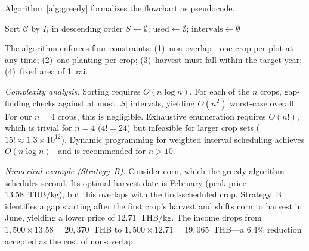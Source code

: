 \documentclass[journal]{IEEEtran}
\begin{document}
Algorithm~\ref{alg:greedy} formalizes the flowchart as pseudocode.

\begin{algorithm}[htbp]
\SetAlgoLined
{}
Sort $\mathcal{C}$ by $I_i$ in descending order\;
$S \leftarrow \emptyset$;\; $\text{used} \leftarrow \emptyset$;\; $\text{intervals} \leftarrow \emptyset$\;
\ForEach{candidate $c_i \in \mathcal{C}$}{
  \If{$c_i.\text{crop} \in \text{used}$}{\textbf{continue}\;}
  $s_i \leftarrow t_i^* - d_i$\;
  \tcp{Strategy A: original dates}
  \If{$[s_i, t_i^*)$ does not overlap any interval in $\text{intervals}$}{
    $S \leftarrow S \cup \{c_i\}$ with original dates\;
  }
  \tcp{Strategy B: shift to available gap}
  \ElseIf{$\exists$ gap $[g_s, g_e)$ in $\text{intervals}$ where $g_e - g_s \geq d_i$}{
    Shift $c_i$ to gap; recalculate $I_i$ at new harvest date\;
    $S \leftarrow S \cup \{c_i\}$ with shifted dates\;
  }
  \tcp{Strategy C: plant in previous year}
  \ElseIf{$c_i$ can start in previous year with harvest in target year}{
    $S \leftarrow S \cup \{c_i\}$ with adjusted dates\;
  }
  \Else{Exclude $c_i$\;}
  $\text{used} \leftarrow \text{used} \cup \{c_i.\text{crop}\}$\;
  Update $\text{intervals}$\;
}
\caption{Greedy Crop Scheduling}
\label{alg:greedy}
\end{algorithm}

The algorithm enforces four constraints: (1)~non-overlap---one crop per plot at any time; (2)~one planting per crop; (3)~harvest must fall within the target year; (4)~fixed area of 1~rai.

\textit{Complexity analysis.} Sorting requires $O(n \log n)$. For each of the $n$ crops, gap-finding checks against at most $|S|$ intervals, yielding $O(n^2)$ worst-case overall. For our $n = 4$ crops, this is negligible. Exhaustive enumeration requires $O(n!)$, which is trivial for $n = 4$ ($4! = 24$) but infeasible for larger crop sets ($15! \approx 1.3 \times 10^{12}$). Dynamic programming for weighted interval scheduling achieves $O(n \log n)$~\cite{kleinberg2005} and is recommended for $n > 10$.

\textit{Numerical example (Strategy~B).} Consider corn, which the greedy algorithm schedules second. Its optimal harvest date is February (peak price 13.58~THB/kg), but this overlaps with the first-scheduled crop. Strategy~B identifies a gap starting after the first crop's harvest and shifts corn to harvest in June, yielding a lower price of 12.71~THB/kg. The income drops from $1{,}500 \times 13.58 = 20{,}370$~THB to $1{,}500 \times 12.71 = 19{,}065$~THB---a 6.4\% reduction accepted as the cost of non-overlap.
\end{document}
